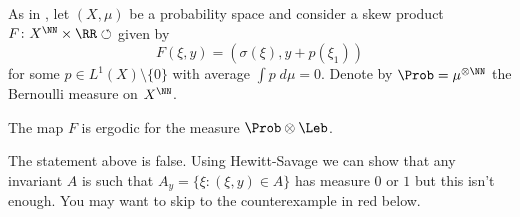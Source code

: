 \documentclass[b5paper]{article}
\begin{document}
As in \cite{bonifantSchwarzianDerivativesCylinder2008}, let \((X,\mu)\) be a probability space and consider a skew product \(F\colon X^{\NN} \times \RR \circlearrowleft\) given by
\begin{equation*}
  F(\xi,y) = (\sigma(\xi), y + p(\xi_1))
\end{equation*}
for some \(p \in L^1(X) \setminus \{ 0 \}\) with average \(\int p \;d \mu = 0\). Denote by \(\Prob = \mu^{\otimes \NN}\) the Bernoulli measure on \(X^{\NN}\).

\begin{lemma}
  The map \(F\) is ergodic for the measure \(\Prob \otimes \Leb\).
\end{lemma}

The statement above is false. Using Hewitt-Savage we can show that any invariant \(A\) is such that \(A_y = \{ \xi : (\xi,y) \in A \}\) has measure \(0\) or \(1\) but this isn't enough. You may want to skip to the counterexample in red below.
\end{document}
